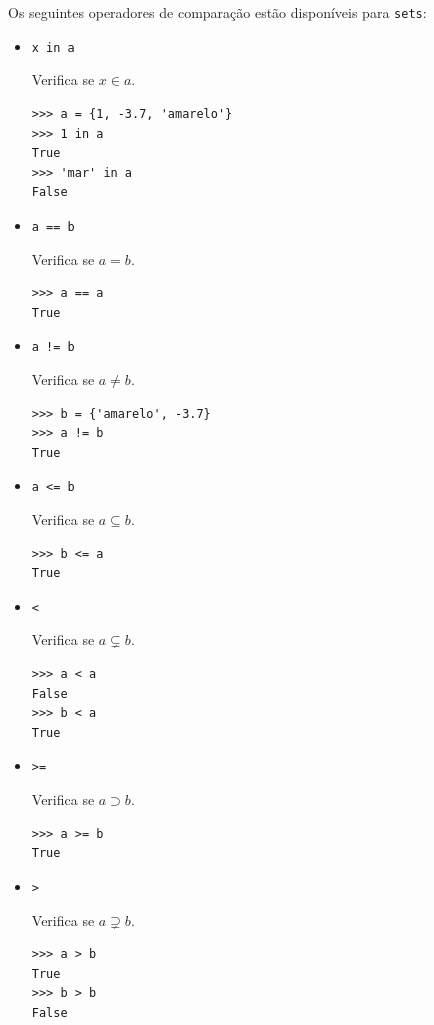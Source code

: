 Os seguintes operadores de comparação estão disponíveis para \texttt{sets}:
\begin{itemize}
\item \lstinline+x in a+ 

  Verifica se $x\in a$.

\begin{lstlisting}[xrightmargin=2.5em]
>>> a = {1, -3.7, 'amarelo'}
>>> 1 in a
True
>>> 'mar' in a
False
\end{lstlisting}

\item \lstinline+a == b+ 

  Verifica se $a = b$.

\begin{lstlisting}[xrightmargin=2.5em]
>>> a == a
True
\end{lstlisting}

\item \lstinline+a != b+ 

  Verifica se $a \neq b$.

\begin{lstlisting}[xrightmargin=2.5em]
>>> b = {'amarelo', -3.7}
>>> a != b
True
\end{lstlisting}
  
\item \lstinline+a <= b+ 

  Verifica se $a \subseteq b$.

\begin{lstlisting}[xrightmargin=2.5em]
>>> b <= a
True
\end{lstlisting}

\item \lstinline+<+ 

  Verifica se $a\subsetneq b$.

\begin{lstlisting}[xrightmargin=2.5em]
>>> a < a
False
>>> b < a
True
\end{lstlisting}

\item \lstinline+>=+ 

    Verifica se $a\supset b$.

\begin{lstlisting}[xrightmargin=2.5em]
>>> a >= b
True
\end{lstlisting}

\item \lstinline+>+ 

  Verifica se $a\supsetneq b$.
  
\begin{lstlisting}[xrightmargin=2.5em]
>>> a > b
True
>>> b > b
False
\end{lstlisting}
\end{itemize}


